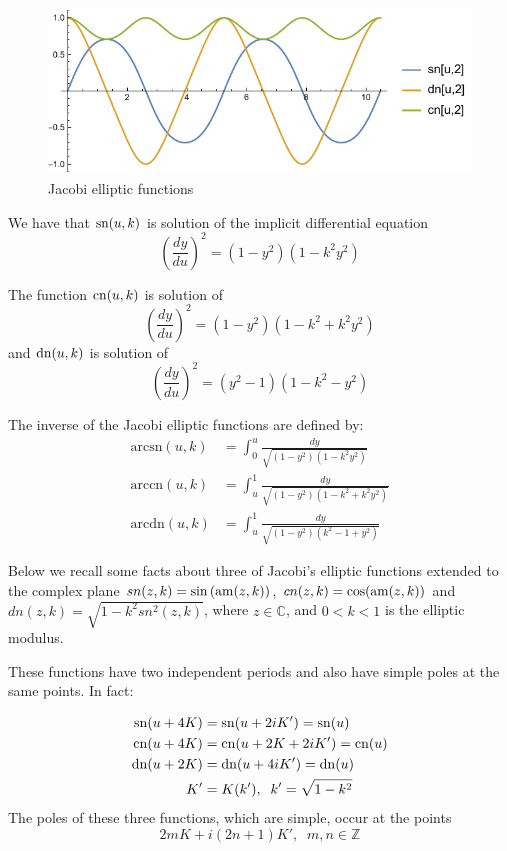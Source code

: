\begin{figure}[H]
    \begin{center}
    \includegraphics[scale=0.8]{zappD/pics/pics_appD_020_plot_jacobi.pdf}
    \caption{Jacobi elliptic functions}
    \label{fig:jacobi_SCD}
    \end{center}
\end{figure}

We have that $\mathrm{sn}(u,k)$ is solution of the implicit differential equation
\[\left(\frac{dy}{du}\right)^2=(1-y^2)(1-k^2y^2)\]

The function $\mathrm{cn}(u,k)$ is solution of 
\[\left(\frac{dy}{du}\right)^2=(1-y^2)(1-k^2+k^2y^2)\]
and $\mathrm{dn}(u,k)$ is solution of
\[\left(\frac{dy}{du}\right)^2=( y^2-1)(1-k^2-y^2)\]

The inverse of the Jacobi elliptic functions are defined by:
\begin{align*}
  \mathrm{arcsn}(u,k)&=\int_0^u\frac{dy}{\sqrt{(1-y^2)(1-k^2y^2)}}\\
    \mathrm{arccn}(u,k)&=\int_u^1\frac{dy}{\sqrt{(1-y^2)(1-k^2+k^2y^2)}}\\
      \mathrm{arcdn}(u,k)&=\int_u^1\frac{dy}{\sqrt{(1-y^2)( k^2-1+y^2)}}
\end{align*}

Below we recall some   facts about three of Jacobi's elliptic functions extended to the complex plane $sn(z,k)=\sin{(\mathrm{am}(z,k))}$, $cn(z,k)=\cos(\mathrm{am}(z,k))$ and $dn(z,k)=\sqrt{1-k^2sn^2(z,k)}$, where $z \in \mathbb{C}$, and $0<k<1$ is the elliptic modulus. 

These functions have two independent periods and also have simple poles at the same points. In fact:

\begin{align*}
    \mathrm{sn}(u+4K)&=\mathrm{sn}(u+2iK')=\mathrm{sn}(u)\\
    \mathrm{cn}(u+4K)&=\mathrm{cn}(u+2K+2iK')=\mathrm{cn}(u)\\
    \mathrm{dn}(u+2K)&=\mathrm{dn}(u+4iK')=\mathrm{dn}(u)\\
    K'&=K(k'), \;\;k'=\sqrt{1-k^2}
\end{align*}
The  poles of these three functions, which are simple, occur at the points
\[2mK+i(2n+1)K'
,\;\; m,n\in \mathbb{Z}\]

